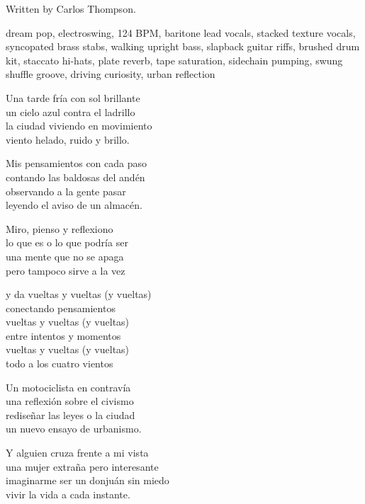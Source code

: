 
\begin{notes}
Written by Carlos Thompson.
\end{notes}
\begin{style}
dream pop, electroswing, 124 BPM, baritone lead vocals, stacked texture vocals, syncopated brass stabs, walking upright bass, slapback guitar riffs, brushed drum kit, staccato hi-hats, plate reverb, tape saturation, sidechain pumping, swung shuffle groove, driving curiosity, urban reflection
\end{style}
\begin{lyrics}
Una tarde fría con sol brillante\\
un cielo azul contra el ladrillo\\
la ciudad viviendo en movimiento\\
viento helado, ruido y brillo.

Mis pensamientos con cada paso\\
contando las baldosas del andén\\
observando a la gente pasar\\
leyendo el aviso de un almacén.

Miro, pienso y reflexiono\\
lo que es o lo que podría ser\\
una mente que no se apaga\\
pero tampoco sirve a la vez

y da vueltas y vueltas (y vueltas)\\
conectando pensamientos\\
vueltas y vueltas (y vueltas)\\
entre intentos y momentos\\
vueltas y vueltas (y vueltas)\\
todo a los cuatro vientos

Un motociclista en contravía\\
una reflexión sobre el civismo\\
rediseñar las leyes o la ciudad\\
un nuevo ensayo de urbanismo.

Y alguien cruza frente a mi vista\\
una mujer extraña pero interesante\\
imaginarme ser un donjuán sin miedo\\
vivir la vida a cada instante.


\end{lyrics}
